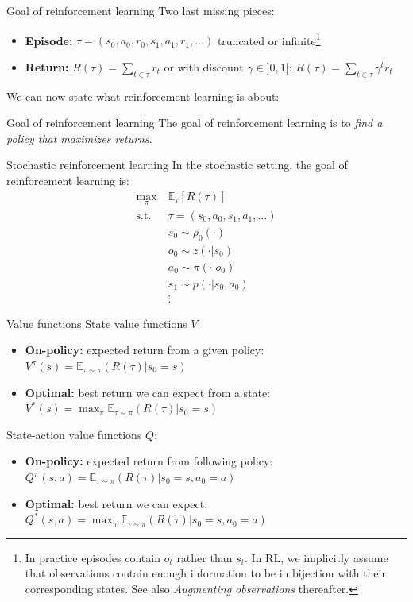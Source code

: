 \documentclass[10pt, aspectratio=1610]{beamer}
\begin{document}
\begin{frame}{Goal of reinforcement learning}
    Two last missing pieces:
    \begin{itemize}
        \item \textbf{Episode:} $\tau = (s_0, a_0, r_0, s_1, a_1, r_1, \ldots)$ truncated or infinite\footnote{In practice episodes contain $o_t$ rather than $s_t$. In RL, we implicitly assume that observations contain enough information to be in bijection with their corresponding states. See also \emph{Augmenting observations} thereafter.}
        \item \textbf{Return:} $R(\tau) = \sum_{t \in \tau} r_t$ or with discount $\gamma \in ]0, 1[$: $R(\tau) = \sum_{t \in \tau} \gamma^t r_t$
    \end{itemize}
    We can now state what reinforcement learning is about:

    \vspace{1ex}
    \begin{block}{Goal of reinforcement learning}
        The goal of reinforcement learning is to \emph{find a policy that maximizes returns}.
    \end{block}
\end{frame}

\begin{frame}{Stochastic reinforcement learning}
    In the stochastic setting, the goal of reinforcement learning is:
    \begin{align*}
        \max_{\pi} \ & \mathbb{E}_{\tau} [R(\tau)] \\
        \mathrm{s.t.} \ & \tau = (s_0, a_0, s_1, a_1, \ldots) \\
        & s_0 \sim \rho_0(\cdot) \\
        & o_0 \sim z(\cdot | s_0) \\
        & a_0 \sim \pi(\cdot | o_0) \\
        & s_1 \sim p(\cdot | s_0, a_0) \\
        & \vdots
    \end{align*}
\end{frame}

\begin{frame}{Value functions}
    State value functions $V$:
    \begin{itemize}
        \item \textbf{On-policy:} expected return from a given policy: $V^\pi(s) = \mathbb{E}_{\tau \sim \pi}(R(\tau) | s_0 = s)$
        \item \textbf{Optimal:} best return we can expect from a state: $V^*(s) = \max_\pi \mathbb{E}_{\tau \sim \pi}(R(\tau) | s_0 = s)$
    \end{itemize}
    State-action value functions $Q$:
    \begin{itemize}
        \item \textbf{On-policy:} expected return from following policy: $Q^\pi(s, a) = \mathbb{E}_{\tau \sim \pi}(R(\tau) | s_0 = s, a_0 = a)$
        \item \textbf{Optimal:} best return we can expect: $Q^*(s, a) = \max_\pi \mathbb{E}_{\tau \sim \pi}(R(\tau) | s_0 = s, a_0 = a)$
    \end{itemize}
\end{frame}
\end{document}
